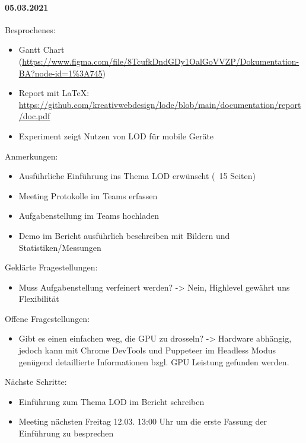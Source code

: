 \paragraph{05.03.2021}
Besprochenes:
\begin{itemize}
  \item Gantt Chart (\url{https://www.figma.com/file/8TcufkDndGDy1OalGoVVZP/Dokumentation-BA?node-id=1\%3A745})
  \item Report mit LaTeX: \url{https://github.com/kreativwebdesign/lode/blob/main/documentation/report/doc.pdf}
  \item Experiment zeigt Nutzen von LOD für mobile Geräte
\end{itemize}
Anmerkungen:
\begin{itemize}
  \item Ausführliche Einführung ins Thema LOD erwünscht (~15 Seiten)
  \item Meeting Protokolle im Teams erfassen
  \item Aufgabenstellung im Teams hochladen
  \item Demo im Bericht ausführlich beschreiben mit Bildern und Statistiken/Messungen
\end{itemize}
Geklärte Fragestellungen:
\begin{itemize}
  \item Muss Aufgabenstellung verfeinert werden? -> Nein, Highlevel gewährt uns Flexibilität
\end{itemize}
Offene Fragestellungen:
\begin{itemize}
  \item Gibt es einen einfachen weg, die GPU zu drosseln? -> Hardware abhängig, jedoch kann mit Chrome DevTools und Puppeteer im Headless Modus genügend detaillierte Informationen bzgl. GPU Leistung gefunden werden.
\end{itemize}
Nächste Schritte:
\begin{itemize}
  \item Einführung zum Thema LOD im Bericht schreiben
  \item Meeting nächsten Freitag 12.03. 13:00 Uhr um die erste Fassung der Einführung zu besprechen
\end{itemize}

\newpage

